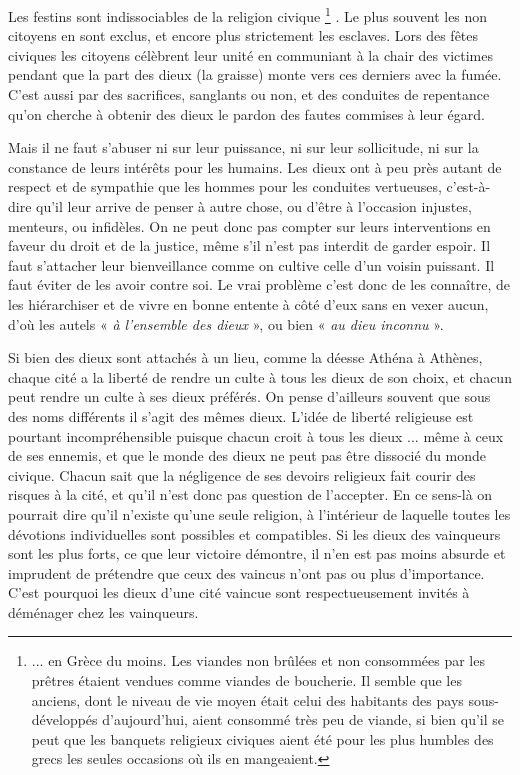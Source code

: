  Les festins sont indissociables de la religion civique%
\footnote{... en Grèce du moins. Les viandes non brûlées et non consommées par les prêtres étaient vendues comme viandes de boucherie. Il semble que les anciens, dont le niveau de vie moyen était celui des habitants des pays sous-développés d'aujourd'hui, aient consommé très peu de viande, si bien qu'il se peut que les banquets religieux civiques aient été pour les plus humbles des grecs les seules occasions où ils en mangeaient.}%
. Le plus souvent les non citoyens en sont exclus, et encore plus strictement les esclaves. Lors des fêtes civiques les citoyens célèbrent leur unité en communiant à la chair des victimes pendant que la part des dieux (la graisse) monte vers ces derniers avec la fumée. C'est aussi par des sacrifices, sanglants ou non, et des conduites de repentance qu'on cherche à obtenir des dieux le pardon des fautes commises à leur égard. 

 Mais il ne faut s'abuser ni sur leur puissance, ni sur leur sollicitude, ni sur la constance de leurs intérêts pour les humains. Les dieux ont à peu près autant de respect et de sympathie que les hommes pour les conduites vertueuses, c'est-à-dire qu'il leur arrive de penser à autre chose, ou d'être à l'occasion injustes, menteurs, ou infidèles. On ne peut donc pas compter sur leurs interventions en faveur du droit et de la justice, même s'il n'est pas interdit de garder espoir. Il faut s'attacher leur bienveillance comme on cultive celle d'un voisin puissant. Il faut éviter de les avoir contre soi. Le vrai problème c'est donc de les connaître, de les hiérarchiser et de vivre en bonne entente à côté d'eux sans en vexer aucun, d'où les autels « \emph{à l'ensemble des dieux} », ou bien « \emph{au dieu inconnu} ». 

 Si bien des dieux sont attachés à un lieu, comme la déesse Athéna à Athènes, chaque cité a la liberté de rendre un culte à tous les dieux de son choix, et chacun peut rendre un culte à ses dieux préférés. On pense d'ailleurs souvent que sous des noms différents il s'agit des mêmes dieux. L'idée de liberté religieuse est pourtant incompréhensible puisque chacun croit à tous les dieux ... même à ceux de ses ennemis, et que le monde des dieux ne peut pas être dissocié du monde civique. Chacun sait que la négligence de ses devoirs religieux fait courir des risques à la cité, et qu'il n'est donc pas question de l'accepter. En ce sens-là on pourrait dire qu'il n'existe qu'une seule religion, à l'intérieur de laquelle toutes les dévotions individuelles sont possibles et compatibles. Si les dieux des vainqueurs sont les plus forts, ce que leur victoire démontre, il n'en est pas moins absurde et imprudent de prétendre que ceux des vaincus n'ont pas ou plus d'importance. C'est pourquoi les dieux d'une cité vaincue sont respectueusement invités à déménager chez les vainqueurs. 

